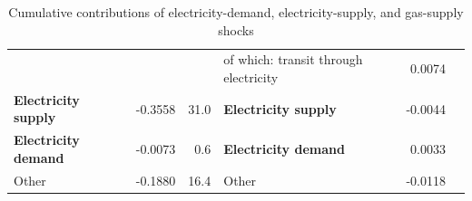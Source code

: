 \begin{table}[!t]
{\begin{tabular}{lrrlrr}
 &  &  & \hspace*{15pt} of which: transit through electricity & 0.0074 &  \\
{\bfseries \hspace*{7.5pt} Electricity supply} & -0.3558 & 31.0 & {\bfseries \hspace*{7.5pt} Electricity supply} & -0.0044 &  \\
{\bfseries \hspace*{7.5pt} Electricity demand} & -0.0073 & 0.6 & {\bfseries \hspace*{7.5pt} Electricity demand} & 0.0033 &  \\
\hspace*{7.5pt} Other & -0.1880 & 16.4 & \hspace*{7.5pt} Other & -0.0118 &  \\
\bottomrule
\end{tabular}
}
\caption{Cumulative contributions of electricity-demand, electricity-supply, and gas-supply shocks}
\label{tab:cumulative-contributions-electricity-energy-three-shocks}
\end{table}
